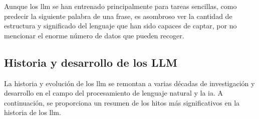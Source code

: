 Aunque los \acrshort{llm}  se han entrenado principalmente para tareas sencillas, como predecir la siguiente palabra de una frase, es asombroso ver la cantidad de estructura y significado del lenguaje que han sido capaces de captar, por no mencionar el enorme número de datos que pueden recoger.

\subsection{Historia y desarrollo de los LLM}

La historia y evolución de los \acrshort{llm} se remontan a varias décadas de investigación y desarrollo en el campo del procesamiento de lenguaje natural y la \acrlong{ia}. A continuación, se proporciona un resumen de los hitos más significativos en la historia de los \acrshort{llm}\cite{zhao2023survey,scribbleData,Tolaka}.


